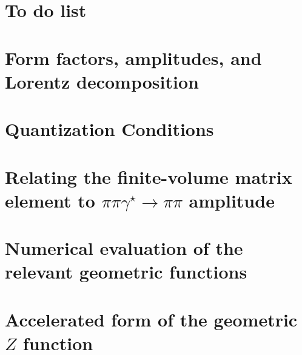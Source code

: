 \documentclass[prd,showkeys,preprintnumbers,floatfix,superscriptaddress, nofootinbib]{revtex4}
\begin{document}
\tableofcontents

\clearpage

\section{To do list}


\section{Form factors, amplitudes, and Lorentz decomposition}


\section{Quantization Conditions}


\section{Relating the finite-volume matrix element to $\pi\pi\gamma^\star\to\pi\pi$ amplitude \label{sec:pipigs_pipi}}


\section{Numerical evaluation of the relevant geometric functions}


\appendix

\section{Accelerated form of the geometric $Z$ function}



\clearpage

\end{document}
